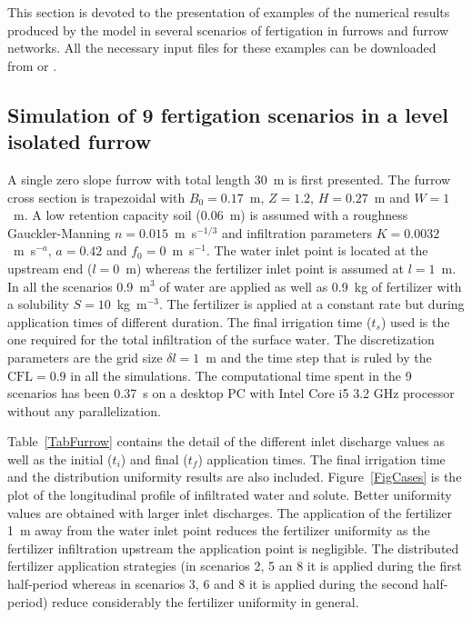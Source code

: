 \documentclass[review,authoryear]{elsarticle}
\begin{document}
This section is devoted to the presentation of examples of the numerical results
produced by the model in several scenarios of fertigation in furrows and furrow
networks. All the necessary input files for these examples can be downloaded
from \cite{Surcos} or \cite{SurcosGit}.

\subsection{Simulation of 9 fertigation scenarios in a level isolated furrow}

A single zero slope furrow with total length 30~m is first presented. The
furrow cross section is trapezoidal with $B_0=0.17$~m, $Z=1.2$, $H=0.27$~m and
$W=1$~m. A low retention capacity soil (0.06~m) is assumed with a roughness 
Gauckler-Manning $n=0.015$~m~s$^{-1/3}$ and infiltration parameters
$K=0.0032$~m~s$^{-a}$, $a=0.42$ and $f_0=0$~m~s$^{-1}$.
The water inlet point is located at the upstream end ($l=0$~m) whereas the
fertilizer inlet point is assumed at $l=1$~m. In all the scenarios 0.9~m$^3$ of
water are applied as well as 0.9~kg of fertilizer with a solubility
$S=10$~kg~m$^{-3}$. The fertilizer is applied at a constant rate but during
application times of different duration. The final irrigation time ($t_s$) used
is the one required for the total infiltration of the surface water. The
discretization parameters are the grid size $\delta l=1$~m and the time step
that is ruled by the $\mathrm{CFL}=0.9$ in all the simulations. The
computational time spent in the 9 scenarios has been 0.37~s on a desktop PC with
Intel Core i5 3.2 GHz processor without any parallelization.

Table~\ref{TabFurrow} contains the detail of the different inlet discharge
values as well as the initial ($t_i$) and final ($t_f$) application times. The
final irrigation time and the distribution uniformity results are also included.
Figure~\ref{FigCases} is the plot of the longitudinal profile of infiltrated
water and solute. Better uniformity values are obtained with larger inlet
discharges. The application of the fertilizer 1~m away from the water inlet
point reduces the fertilizer uniformity as the fertilizer infiltration upstream
the application point is negligible. The distributed fertilizer application
strategies (in scenarios 2, 5 an 8 it is applied during the first half-period
whereas in scenarios 3, 6 and 8 it is applied during the second half-period) reduce
considerably the fertilizer uniformity in general.
\end{document}
